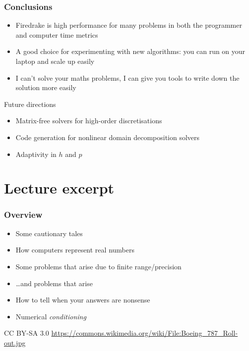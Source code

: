 \documentclass[presentation]{beamer}
\begin{document}
\begin{frame}
  \frametitle{Conclusions}
  \begin{itemize}
  \item Firedrake is high performance for many problems in both
    the programmer and computer time metrics
  \item A good choice for experimenting with new algorithms: you can
    run on your laptop and scale up easily
  \item I can't solve your maths problems, I can give you tools to
    write down the solution more easily
  \end{itemize}

  \begin{block}{Future directions}
    \begin{itemize}
    \item Matrix-free solvers for high-order discretisations
    \item Code generation for nonlinear domain decomposition solvers
    \item Adaptivity in $h$ and $p$
    \end{itemize}
  \end{block}
\end{frame}

\section{Lecture excerpt}

\begin{frame}
  \frametitle{Overview}
  \begin{itemize}
  \item Some cautionary tales
  \item How computers represent real numbers
  \item Some problems that arise due to finite range/precision
  \item \ldots and problems that arise
  \item How to tell when your answers are nonsense
  \item Numerical \emph{conditioning}
  \end{itemize}
\end{frame}

\begin{frame}[plain,t]
  \begin{flushright}
      \tiny CC BY-SA 3.0
      \url{https://commons.wikimedia.org/wiki/File:Boeing_787_Roll-out.jpg}
  \end{flushright}
\end{frame}
\end{document}
